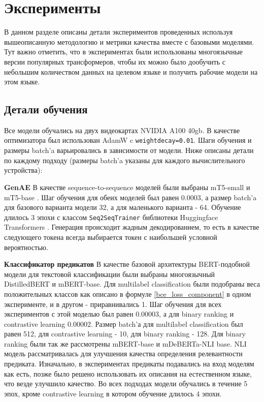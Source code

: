 \section{Эксперименты}

В данном разделе описаны детали экспериментов проведенных используя вышеописанную методологию и метрики качества вместе с базовыми моделями. Тут важно отметить, что в экспериментах были использованы многоязычные версии популярных трансформеров, чтобы их можно было дообучить с небольшим количеством данных на целевом языке и получить рабочие модели на этом языке.

\subsection{Детали обучения}
Все модели обучались на двух видеокартах NVIDIA A100 40gb. В качестве оптимизатора был использован AdamW \cite{adamw} c \texttt{weight\textunderscore decay=0.01}. Шаги обучения и размеры batch'a варьировались в зависимости от модели. Ниже описаны детали по каждому подходу (размеры batch'a указаны для каждого вычислительного устройства):

\textbf{GenAE}   В качестве sequence-to-sequence моделей были выбраны mT5-small и mT5-base \cite{mt5}. Шаг обучения для обеих моделей был равен 0.0003, а размер batch'a для базового варианта модели 32, а для маленького варианта - 64. Обучение длилось 3 эпохи с классом \texttt{Seq2SeqTrainer} библиотеки Huggingface Transformers \cite{wolf2019hf}. Генерация происходит жадным декодированием, то есть в качестве следующего токена всегда выбирается токен с наибольшей условной вероятностью.

\textbf{Классификатор предикатов}   В качестве базовой архитектуры BERT-подобной модели для текстовой классификации были выбраны многоязычный DistilledBERT \cite{distilbert} и mBERT-base. Для multilabel classification были подобраны веса положительных классов как описано в формуле \ref{bce_loss_component} в одном эксперименте, и в другом - приравнивались 1. Шаг обучения для всех экспериментов с этой моделью был равен 0.00003, а для binary ranking и contrastive learning 0.00002. Размер batch'а для multilabel classification был равен 512, для contrastive learning - 10, для binary ranking - 128. Для binary ranking были так же рассмотрены mBERT-base и mDeBERTa-NLI base. NLI модель рассматривалась для улучшения качества определения релевантности предиката. Изначально, в экспериментах предикаты подавались на вход моделям как есть, позже было решено использовать их описания на естественном языке, что везде улучшило качество. Во всех подходах модели обучались в течение 5 эпох, кроме contrastive learning в котором обучение длилось 4 эпохи.

